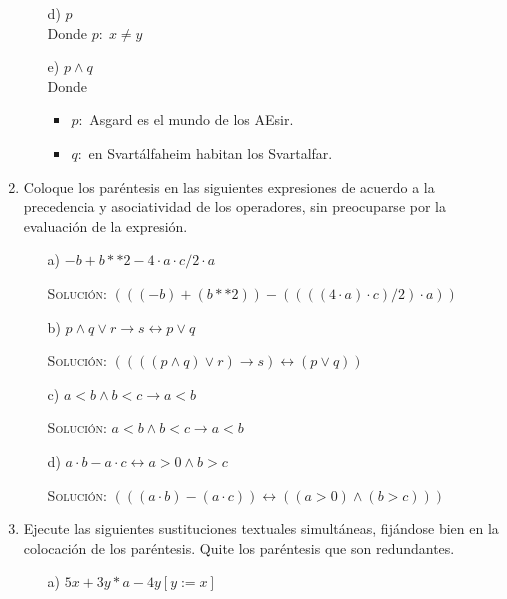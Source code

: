 \documentclass[letterpaper,11pt]{article}
\begin{document}
\begin{enumerate}
\begin{itemize}
        \item[d)] $p$ \\ 
        Donde $p: \; x \neq y$
        \item[e)] $p \land q$ \\ 
        Donde 
        \begin{itemize}
            \item $p:$ Asgard es el mundo de los AEsir.
            \item $q:$ en Svartálfaheim habitan los Svartalfar.
        \end{itemize}
    \end{itemize}

    \item Coloque los paréntesis en las siguientes expresiones de acuerdo a la 
    precedencia y asociatividad de los operadores, sin preocuparse por la
    evaluación de la expresión.

    \begin{itemize}
        \item[a)] $-b + b * * 2 - 4 \cdot a \cdot c / 2 \cdot a$ 
        
        \textsc{Solución:} 
        $(((-b) + (b * * 2)) - ((((4 \cdot a) \cdot c) / 2) \cdot a))$ 

        \item[b)] $p \land q \lor r → s ↔ p \lor q$

        \textsc{Solución:} $((((p \land q) \lor r) → s) ↔ (p \lor q))$

        \item[c)] $a < b \land b < c → a < b$

        \textsc{Solución:} $a < b \land b < c → a < b$

        \item[d)] $a \cdot b -a \cdot c ↔ a > 0 \land b > c$
        
        \textsc{Solución:} 
        $(((a \cdot b) - (a \cdot c)) ↔ ((a > 0) \land (b > c)))$
    \end{itemize}

    \item Ejecute las siguientes sustituciones textuales simultáneas, fijándose
    bien en la colocación de los paréntesis. Quite los paréntesis que son 
    redundantes.

    \begin{itemize}
        \item[a)] $5x + 3y * a - 4y[y := x]$ 


\end{itemize}
\end{enumerate}
\end{document}
